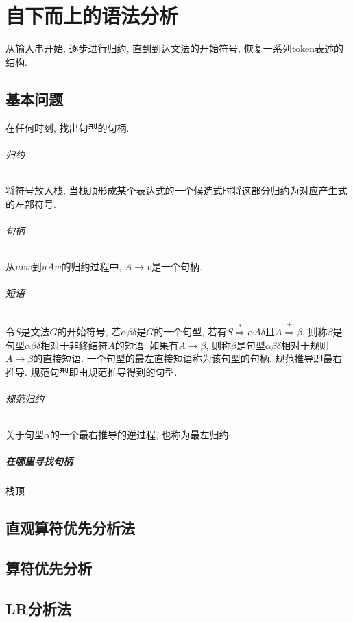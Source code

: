 \chapter{自下而上的语法分析}

    从输入串开始, 逐步进行\textsf{归约}, 直到到达文法的开始符号, 恢复一系列token表述的结构.

    \section{基本问题}

        在任何时刻, 找出句型的句柄.

        \subparagraph{归约} 将符号放入栈, 当栈顶形成某个表达式的一个候选式时将这部分归约为对应产生式的左部符号.

        \subparagraph{句柄} 从$uvw$到$uAw$的归约过程中, $A\to v$是一个句柄.

        \subparagraph{短语} 令$S$是文法$G$的开始符号, 若$\alpha\beta\delta$是$G$的一个句型, 若有$S\stackrel{*}{\Rightarrow}\alpha A\delta$且$A\stackrel{+}{\Rightarrow}\beta$, 则称$\beta$是句型$\alpha\beta\delta$相对于非终结符$A$的\textsf{短语}. 如果有$A\to\beta$, 则称$\beta$是句型$\alpha\beta\delta$相对于规则$A\to\beta$的\textsf{直接短语}. 一个句型的\textsf{最左直接短语}称为该句型的\textsf{句柄}. \textsf{规范推导}即最右推导. \textsf{规范句型}即由规范推导得到的句型.

        \subparagraph{规范归约} 关于句型$\alpha$的一个最右推导的逆过程, 也称为\textsf{最左归约}.

        \paragraph{在哪里寻找句柄}
            栈顶

    \section{直观算符优先分析法}

    \section{算符优先分析}

    \section{LR分析法}
